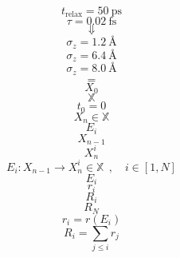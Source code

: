 \documentclass{scrreprt}
\begin{document}
\begin{equation}
 t_\text{relax}=\SI{50}{\pico\second}
\end{equation}
\begin{equation}
\tau=\SI{0.02}{\femto\second}
\end{equation}
\begin{equation}
\Downarrow
\end{equation}
\begin{equation}
\sigma_z = \SI{1.2}{\angstrom}
\end{equation}
\begin{equation}
\sigma_z = \SI{6.4}{\angstrom}
\end{equation}
\begin{equation}
\sigma_z = \SI{8.0}{\angstrom}
\end{equation}
\begin{equation}
\hat{=}
\end{equation}
\begin{equation}
X_0
\end{equation}
\begin{equation}
\mathbb{X}
\end{equation}
\begin{equation}
t_0 = 0
\end{equation}
\begin{equation}
X_n \in \mathbb{X}
\end{equation}
\begin{equation}
E_i
\end{equation}
\begin{equation}
X_{n-1}
\end{equation}
\begin{equation}
X_n^i
\end{equation}
\begin{equation}
  E_i : X_{n-1} \rightarrow X_n^i \in \mathbb{X} ~~,\quad i \in [1, N]
\end{equation}
\begin{equation}
E_i
\end{equation}
\begin{equation}
r_i
\end{equation}
\begin{equation}
R_i
\end{equation}
\begin{equation}
R_N
\end{equation}
\begin{equation}
  r_i = r(E_i)
\end{equation}
\begin{equation}
  R_i = \sum_{j \le i}{r_j}
\end{equation}
\end{document}
